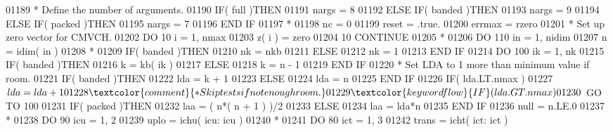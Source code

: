 \begin{DoxyCode}
01189 \textcolor{comment}{*     Define the number of arguments.}
01190       \textcolor{keywordflow}{IF}( full )\textcolor{keywordflow}{THEN}
01191          nargs = 8
01192       \textcolor{keywordflow}{ELSE} \textcolor{keywordflow}{IF}( banded )\textcolor{keywordflow}{THEN}
01193          nargs = 9
01194       \textcolor{keywordflow}{ELSE} \textcolor{keywordflow}{IF}( packed )\textcolor{keywordflow}{THEN}
01195          nargs = 7
01196 \textcolor{keywordflow}{      END IF}
01197 \textcolor{comment}{*}
01198       nc = 0
01199       reset = .true.
01200       errmax = rzero
01201 \textcolor{comment}{*     Set up zero vector for CMVCH.}
01202       \textcolor{keywordflow}{DO} 10 i = 1, nmax
01203          z( i ) = zero
01204    10 \textcolor{keywordflow}{CONTINUE}
01205 \textcolor{comment}{*}
01206       \textcolor{keywordflow}{DO} 110 in = 1, nidim
01207          n = idim( in )
01208 \textcolor{comment}{*}
01209          \textcolor{keywordflow}{IF}( banded )\textcolor{keywordflow}{THEN}
01210             nk = nkb
01211          \textcolor{keywordflow}{ELSE}
01212             nk = 1
01213 \textcolor{keywordflow}{         END IF}
01214          \textcolor{keywordflow}{DO} 100 ik = 1, nk
01215             \textcolor{keywordflow}{IF}( banded )\textcolor{keywordflow}{THEN}
01216                k = kb( ik )
01217             \textcolor{keywordflow}{ELSE}
01218                k = n - 1
01219 \textcolor{keywordflow}{            END IF}
01220 \textcolor{comment}{*           Set LDA to 1 more than minimum value if room.}
01221             \textcolor{keywordflow}{IF}( banded )\textcolor{keywordflow}{THEN}
01222                lda = k + 1
01223             \textcolor{keywordflow}{ELSE}
01224                lda = n
01225 \textcolor{keywordflow}{            END IF}
01226             \textcolor{keywordflow}{IF}( lda.LT.nmax )
01227      $         lda = lda + 1
01228 \textcolor{comment}{*           Skip tests if not enough room.}
01229             \textcolor{keywordflow}{IF}( lda.GT.nmax )
01230      $         \textcolor{keywordflow}{GO TO} 100
01231             \textcolor{keywordflow}{IF}( packed )\textcolor{keywordflow}{THEN}
01232                laa = ( n*( n + 1 ) )/2
01233             \textcolor{keywordflow}{ELSE}
01234                laa = lda*n
01235 \textcolor{keywordflow}{            END IF}
01236             null = n.LE.0
01237 \textcolor{comment}{*}
01238             \textcolor{keywordflow}{DO} 90 icu = 1, 2
01239                uplo = ichu( icu: icu )
01240 \textcolor{comment}{*}
01241                \textcolor{keywordflow}{DO} 80 ict = 1, 3
01242                   trans = icht( ict: ict )

\end{DoxyCode}
